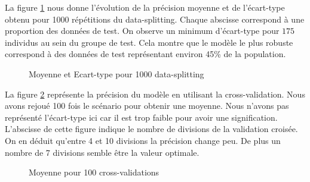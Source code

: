\documentclass[11pt,a4paper]{article}
\begin{document}
			La figure \ref{data-splitting-dt} nous donne l'évolution de la précision moyenne et de l'écart-type obtenu pour 1000 répétitions du data-splitting. Chaque abscisse correspond à une proportion des données de test. On observe un minimum d'écart-type pour $175$ individus au sein du groupe de test. Cela montre que le modèle le plus robuste correspond à des données de test représentant environ 45\% de la population.

			\begin{figure}
				\caption{Moyenne et Ecart-type pour 1000 data-splitting}
				\label{data-splitting-dt}
			\end{figure}

			La figure \ref{cv_dt} représente la précision du modèle en utilisant la cross-validation. Nous avons rejoué 100 fois le scénario pour obtenir une moyenne. Nous n'avons pas représenté l'écart-type ici car il est trop faible pour avoir une signification. L'abscisse de cette figure indique le nombre de divisions de la validation croisée.
			On en déduit qu'entre 4 et 10 divisions la précision change peu. De plus un nombre de 7 divisions semble être la valeur optimale.

			\begin{figure}
			\begin{center}
				\caption{Moyenne pour 100 cross-validations}
				\label{cv_dt}
			\end{center}
			\end{figure}
\end{document}
